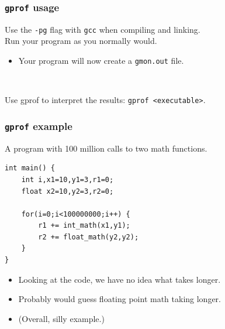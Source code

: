 \documentclass[aspectratio=43]{beamer}
\newenvironment{changemargin}[1]{%
  \begin{list}{}{%
    \setlength{\topsep}{0pt}%
    \setlength{\leftmargin}{#1}%
    \setlength{\rightmargin}{1em}
    \setlength{\listparindent}{\parindent}%
    \setlength{\itemindent}{\parindent}%
    \setlength{\parsep}{\parskip}%
  }%
  \item[]}{\end{list}}
\begin{document}
\begin{frame}
  \frametitle{{\tt gprof} usage}

  \begin{changemargin}{2cm}
    Use the {\tt -pg} flag with {\tt gcc} when compiling and linking.\\[1em]
    Run your program as you normally would.
      \begin{itemize}
        \item Your program will now create a {\tt gmon.out} file.
      \end{itemize}
~\\
    \item Use gprof to interpret the results: {\tt gprof <executable>}.
  \end{changemargin}
\end{frame}

\begin{frame}[fragile]
  \frametitle{{\tt gprof} example}

  \begin{changemargin}{1.5cm}
    A program with 100 million calls to two math functions.

  \begin{lstlisting}
int main() {
    int i,x1=10,y1=3,r1=0;
    float x2=10,y2=3,r2=0;

    for(i=0;i<100000000;i++) {
        r1 += int_math(x1,y1);
        r2 += float_math(y2,y2);
    }
}
  \end{lstlisting}

  \begin{itemize}
    \item Looking at the code, we have no idea what takes longer.
    \item Probably would guess floating point math taking longer.
    \item (Overall, silly example.)
  \end{itemize}
  \end{changemargin}
\end{frame}
\end{document}

